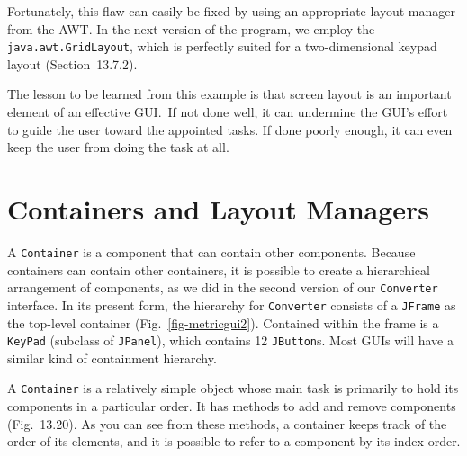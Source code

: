 Fortunately, this flaw can easily be fixed by using an appropriate
layout manager from the AWT. In the next version of the
program, we employ the {\tt java.awt.GridLayout}, which is perfectly suited for
a two-dimensional keypad layout (Section~13.7.2).

The lesson to be learned from this example is that screen layout is an
important element of an effective GUI.~If not done well, it can
undermine the GUI's effort to guide the user toward the appointed
tasks.  If done poorly enough, it can even keep the user from doing the
task at all.






\section{Containers and Layout Managers}
\noindent A {\tt Container} is a component that can contain other components.
Because containers can contain other containers, it is possible to
create a hierarchical arrangement of components, as we did in the
second version of our {\tt Converter} interface.  In its present form,
the hierarchy for {\tt Converter} consists of a {\tt JFrame} as the
top-level container (Fig.~\ref{fig-metricgui2}). Contained within
the frame is a {\tt KeyPad} (subclass of {\tt JPanel}), which contains 12 {\tt JButton}s.
Most GUIs will have a similar kind of containment hierarchy.



A {\tt Container} is a relatively simple object whose main task is
primarily to hold its components in a particular order.  It has
methods to add and remove components (Fig.~13.20).  As you
can see from these methods, a container keeps track of the order of
its elements, and it is possible to refer to a component by its index
order.

